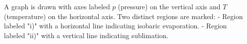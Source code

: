 A graph is drawn with axes labeled \( p \) (pressure) on the vertical axis and \( T \) (temperature) on the horizontal axis. Two distinct regions are marked:  
- Region labeled "i)" with a horizontal line indicating isobaric evaporation.  
- Region labeled "ii)" with a vertical line indicating sublimation.